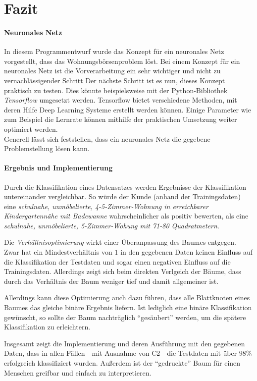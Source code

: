 \section{Fazit}\label{sec:fazit}
\paragraph{Neuronales Netz}
In diesem Programmentwurf wurde das Konzept für ein neuronales Netz vorgestellt, dass das Wohnungsbörsenproblem
löst. Bei einem Konzept für ein neuronales Netz ist die Vorverarbeitung ein sehr wichtiger und nicht zu vernachlässigender 
Schritt Der nächste Schritt ist es nun, dieses Konzept praktisch zu testen. Dies könnte beispielsweise mit der 
Python-Bibliothek \emph{Tensorflow} umgesetzt werden.
Tensorflow bietet verschiedene Methoden, mit deren Hilfe Deep Learning Systeme erstellt werden können.
Einige Parameter wie zum Beispiel die Lernrate können mithilfe der praktischen Umsetzung weiter optimiert werden. \\
Generell lässt sich feststellen, dass ein neuronales Netz die gegebene Problemstellung lösen kann. 

\paragraph{Ergebnis und Implementierung}
Durch die Klassifikation eines Datensatzes werden Ergebnisse der Klassifikation untereinander vergleichbar.
So würde der Kunde (anhand der Trainingsdaten) eine  \emph{schulnahe, unmöbelierte, 4-5-Zimmer-Wohnung in erreichbarer Kindergartennähe mit Badewanne} wahrscheinlicher als positiv bewerten,
als eine \emph{schulnahe, unmöbelierte, 5-Zimmer-Wohung mit 71-80 Quadratmetern}.

Die \emph{Verhältnisoptimierung} wirkt einer Überanpassung des Baumes entgegen.
Zwar hat ein Mindestverhältnis von $1$ in den gegebenen Daten keinen Einfluss auf die Klassifikation der Testdaten und sogar einen negativen Einfluss auf die Trainingsdaten.
Allerdings zeigt sich beim direkten Verlgeich der Bäume,
dass durch das Verhältnis der Baum weniger tief und damit allgemeiner ist.

Allerdings kann diese Optimierung auch dazu führen,
dass alle Blattknoten eines Baumes das gleiche binäre Ergebnis liefern.
Ist lediglich eine binäre Klassifikation gewünscht,
so sollte der Baum nachträglich \enquote{gesäubert} werden,
um die spätere Klassifikation zu erleichtern.

Insgesamt zeigt die Implementierung und deren Ausführung mit den gegebenen Daten,
dass in allen Fällen - mit Ausnahme von C2 - die Testdaten mit über $98\%$ erfolgreich klassifiziert wurden.
Außerdem ist der \enquote{gedruckte} Baum für einen Menschen greifbar und einfach zu interpretieren.